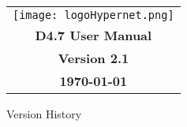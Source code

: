\documentclass[a4paper,11pt,notitlepage]{article}
\newcommand{\numVersion}{2.1}
\newcommand{\titleDoc}{D4.7 User Manual}
\begin{document}
\hypersetup{pageanchor=false}
\begin{titlepage}
\thispagestyle{fancy}
\vspace*{8mm}
\begin{center}
    \begin{tabularx}{\textwidth}{c}
        \texttt{[image: logoHypernet.png]}
        \vspace{2mm} \\
        \Large{\textbf{\titleDoc}} \\
        \Large{\textbf{Version \numVersion}} \\
        \Large{\textbf{\today}}
    \end{tabularx}
\end{center}
\end{titlepage}
\setcounter{page}{2}
\noindent Version History
\vspace{8pt}
\newline
\end{document}
